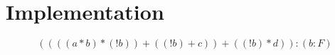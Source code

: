 \section{Implementation}
\begin{example}
\[
	((((a*b)*(!b))+((!b)+c))+((!b)*d)):(b:F)
\]
\end{example}